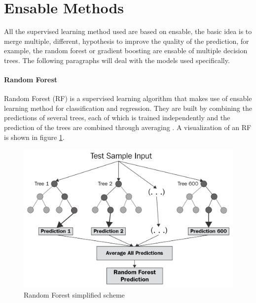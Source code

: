\documentclass[%
    corpo=12pt,
    twoside,
    oldstyle,
    autoretitolo,
    greek,
    evenboxes,
]{toptesi}
\begin{document}
\section{Ensable Methods}
All the supervised learning method used are based on ensable, the basic idea is to merge multiple, different, hypothesis to improve the quality of the prediction, for example, the random forest or gradient boosting are ensable of multiple decision trees. The following paragraphs will deal with the models used specifically.

\paragraph{Random Forest}
Random Forest (RF) is a supervised learning algorithm that makes use of ensable learning method for classification and regression. They are built by combining the predictions of several trees, each of which is trained independently and the prediction of the trees are combined through averaging \cite{RF_theory}. A visualization of an RF is shown in figure \ref{fig:rf}.

\begin{figure}[!ht]
  \includegraphics[width=\linewidth]{figure/rf.png}
  \caption{Random Forest simplified scheme \cite{rf}}
  \label{fig:rf}
\end{figure}
\end{document}
